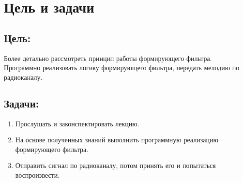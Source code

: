 \chapter{Цель и задачи}
\label{ch:intro}

\section*{\textbf{Цель:}}

Более детально рассмотреть принцип работы формирующего фильтра. Программно реализовать логику формирующего фильтра, передать
мелодию по радиоканалу. 

\section*{\textbf{Задачи:}}

\begin{enumerate}
    \item Прослушать и законспектировать лекцию.
    \item На основе полученных знаний выполнить программную реализацию формирующего фильтра.
    \item Отправить сигнал по радиоканалу, потом принять его и попытаться воспроизвести.
\end{enumerate}

\endinput